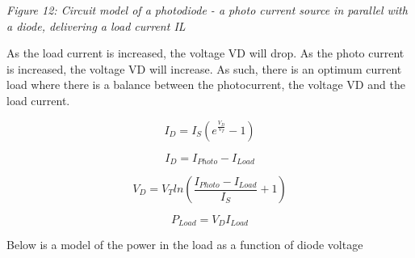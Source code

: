 {
\centering
{}
}

\emph{Figure 12: Circuit model of a photodiode - a photo current source
in parallel with a diode, delivering a load current IL}

As the load current is increased, the voltage VD will drop. As the photo
current is increased, the voltage VD will increase. As such, there is an
optimum current load where there is a balance between the photocurrent,
the voltage VD and the load current.

\[ I_D = I_S\left(e^\frac{V_D}{V_T} - 1\right)\]

\[ I_D = I_{Photo} - I_{Load}\]

\[ V_D = V_T ln{\left(\frac{I_{Photo} - I_{Load}}{I_S} + 1 \right)} \]

\[ P_{Load} = V_D I_{Load}\]

Below is a model of the power in the load as a function of diode voltage

\begin{Shaded}
\begin{Highlighting}[]

\OperatorTok{=}   
\OperatorTok{=}\NormalTok{,}\NormalTok{,}\NormalTok{)}

\OperatorTok{=}   
\OperatorTok{=}   

\OperatorTok{=} \OperatorTok{*}\OperatorTok{/}  

\OperatorTok{=}\OperatorTok{*}\OperatorTok{{-}}\OperatorTok{/}\OperatorTok{+} \NormalTok{)}

\OperatorTok{=}\OperatorTok{*}

\NormalTok{,}\NormalTok{,}\NormalTok{)}
\OperatorTok{/}
\NormalTok{)}
\NormalTok{,}\NormalTok{,}\NormalTok{)}
\OperatorTok{/}\OperatorTok{/}
\NormalTok{)}
\NormalTok{)}
\NormalTok{)}
\end{Highlighting}
\end{Shaded}

